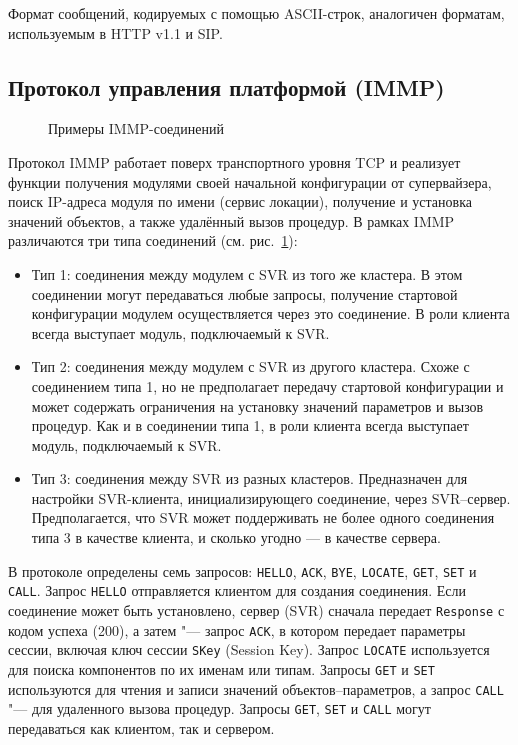 Формат сообщений, кодируемых с помощью ASCII-строк, аналогичен форматам, используемым в HTTP v1.1 и SIP.


\subsection{Протокол управления платформой (IMMP)}\label{sec:ch5_immp}

\begin{figure}[ht] 
  \caption{Примеры IMMP-соединений}
  \label{fig:ch5_immp_connections}
\end{figure}

Протокол IMMP работает поверх транспортного уровня TCP и реализует функции получения модулями своей начальной конфигурации от супервайзера, поиск IP-адреса модуля по имени (сервис локации), получение и установка значений объектов, а также удалённый вызов процедур. В рамках IMMP различаются три типа соединений (см. рис.~\ref{fig:ch5_immp_connections}):

\begin{itemize}
	\item Тип 1: соединения между модулем с SVR из того же кластера. В этом соединении могут передаваться любые запросы, получение стартовой конфигурации модулем осуществляется через это соединение. В роли клиента всегда выступает модуль, подключаемый к SVR.
	\item Тип 2: соединения между модулем с SVR из другого кластера. Схоже с соединением типа 1, но не предполагает передачу стартовой конфигурации и может содержать ограничения на установку значений параметров и вызов процедур. Как и в соединении типа 1, в роли клиента всегда выступает модуль, подключаемый к SVR.
	\item Тип 3: соединения между SVR из разных кластеров. Предназначен для настройки SVR-клиента, инициализирующего соединение, через SVR--сервер. Предполагается, что SVR может поддерживать не более одного соединения типа 3 в качестве клиента, и сколько угодно --- в качестве сервера.
\end{itemize}

В протоколе определены семь запросов: \texttt{HELLO}, \texttt{ACK}, \texttt{BYE}, \texttt{LOCATE}, \texttt{GET}, \texttt{SET} и \texttt{CALL}. Запрос \texttt{HELLO} отправляется клиентом для создания соединения. Если соединение может быть установлено, сервер (SVR) сначала передает \texttt{Response} с кодом успеха (200), а затем "--- запрос \texttt{ACK}, в котором передает параметры сессии, включая ключ сессии \texttt{SKey} (Session Key). Запрос \texttt{LOCATE} используется для поиска компонентов по их именам или типам. Запросы \texttt{GET} и \texttt{SET} используются для чтения и записи значений объектов--параметров, а запрос \texttt{CALL} "--- для удаленного вызова процедур. Запросы \texttt{GET}, \texttt{SET} и \texttt{CALL} могут передаваться как клиентом, так и сервером.

